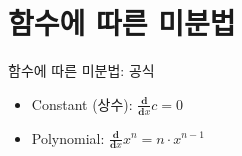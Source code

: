 \documentclass[aspectratio=169]{beamer}
\begin{document}







\section{함수에 따른 미분법}

\begin{frame}{함수에 따른 미분법: 공식}
  \begin{itemize}
    \item Constant (상수): \( \frac{\mathbf{d}}{\mathbf{d}x} c = 0 \)
    \item Polynomial: $ \frac{\mathbf{d}}{\mathbf{d}x} x^n = n \cdot x^{n-1}  $
  \end{itemize}
\end{frame}

    
  
\end{document}
